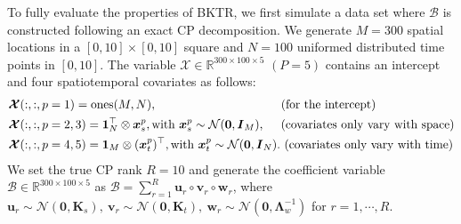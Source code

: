 \documentclass[12pt]{article}
\newcommand{\bd}[1]{\boldsymbol{#1}}
\begin{document}
To fully evaluate the properties of BKTR, we first simulate a data set where $\boldsymbol{\mathcal{B}}$ is constructed following an exact CP decomposition. We generate $M=300$ spatial locations in a $[0,10]\times[0,10]$ square and $N=100$ uniformed distributed time points in $[0,10]$. The variable ${\boldsymbol{\mathcal{X}}\in\mathbb{R}^{300\times100\times5}}$ ${(P=5)}$ contains an intercept and four spatiotemporal covariates as follows:
\begin{equation} \label{Eq:X_generate}
\begin{aligned}
    \bd{\cal{X}}&(:,:,p=1)=\operatorname{ones}(M,N),~~~~~~~~~~~~~~~~~~~~~~~~~~~~~~~\text{(for the intercept)}\\
    \boldsymbol{\mathcal{X}}&(:,:,p=2,3)=\boldsymbol{1}_{N}^{\top}\otimes\boldsymbol{x}_{s}^{p},\text{with } \boldsymbol{x}_{s}^{p}\sim\mathcal{N}(\boldsymbol{0},\boldsymbol{I}_{M}),~~~~\text{(covariates only vary with space)}\\
    \boldsymbol{\mathcal{X}}&(:,:,p=4,5)=\boldsymbol{1}_{M}\otimes(\boldsymbol{x}_{t}^{p})^{\top},\text{with }\boldsymbol{x}_{t}^{p}\sim\mathcal{N}(\boldsymbol{0},\boldsymbol{I}_{N}).\text{ (covariates only vary with time)}
\end{aligned}
\end{equation}
We set the true CP rank $R=10$ and generate the coefficient variable $\boldsymbol{\mathcal{B}}\in\mathbb{R}^{300\times100\times5}$ as $\boldsymbol{\mathcal{B}}=\sum_{r=1}^{R}\boldsymbol{u}_{r}\circ\boldsymbol{v}_{r}\circ\boldsymbol{w}_{r}$, where $\boldsymbol{u}_{r}\sim\mathcal{N}(\boldsymbol{0},\boldsymbol{K}_{s}),~\boldsymbol{v}_{r}\sim\mathcal{N}(\boldsymbol{0},\boldsymbol{K}_{t}),~\boldsymbol{w}_{r}\sim\mathcal{N}(\boldsymbol{0},\boldsymbol{\Lambda}_{w}^{-1})$ for $r=1,\cdots,R$. %
\end{document}
